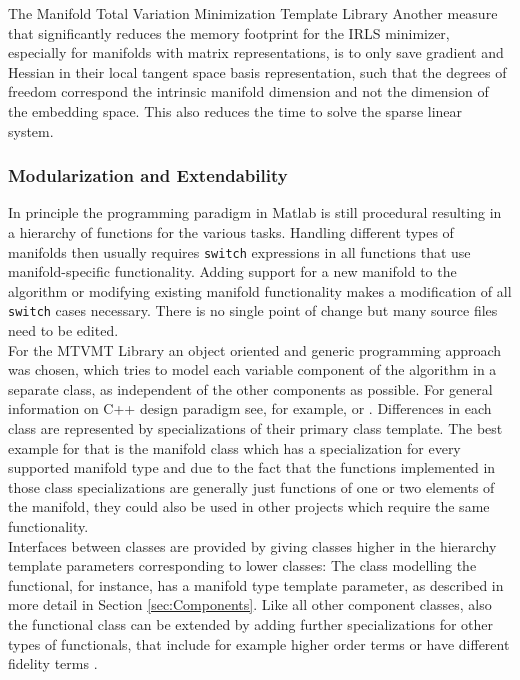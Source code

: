 \begin{chapter}{The Manifold Total Variation Minimization Template Library}
Another measure that significantly reduces the memory footprint for the IRLS minimizer, especially for manifolds with matrix representations, is to only save gradient and Hessian
in their local tangent space basis representation, such that the degrees of freedom correspond the intrinsic manifold dimension and not the dimension of the embedding space. This also reduces
the time to solve the sparse linear system.\\

\subsubsection{Modularization and Extendability} %
\label{ssub:Modularization}
In principle the programming paradigm in Matlab is still procedural resulting in a hierarchy of functions for the various tasks. Handling different types of manifolds
then usually requires \texttt{switch} expressions in all functions that use manifold-specific functionality. Adding support for a new manifold to the algorithm or modifying
existing manifold functionality makes a modification of all \texttt{switch} cases necessary. There is no single point of change but many source files need to be edited.\\

For the MTVMT Library an object oriented and generic programming approach was chosen, which tries to model each variable component of the algorithm in a separate class, as 
independent of the other components as possible. For general information on C++ design paradigm see, for example, \cite{CPPTemplateMP} or \cite{CPPGeneric}.
Differences in each class are represented by specializations of their primary class template. The best example for that is the
manifold class which has a specialization for every supported manifold type and due to the fact that the functions implemented in those class specializations are generally
just functions of one or two elements of the manifold, they could also be used in other projects which require the same functionality.\\

Interfaces between classes are provided by giving classes higher in the hierarchy template parameters corresponding to lower classes: The class modelling the functional, for instance,
has a manifold type template parameter, as described in more detail in Section \ref{sec:Components}. Like all other component classes, also the functional class can be extended
by adding further specializations for other types of functionals, that include for example higher order terms or have different fidelity terms \cite{SceneFlow}.\\


\end{chapter}

